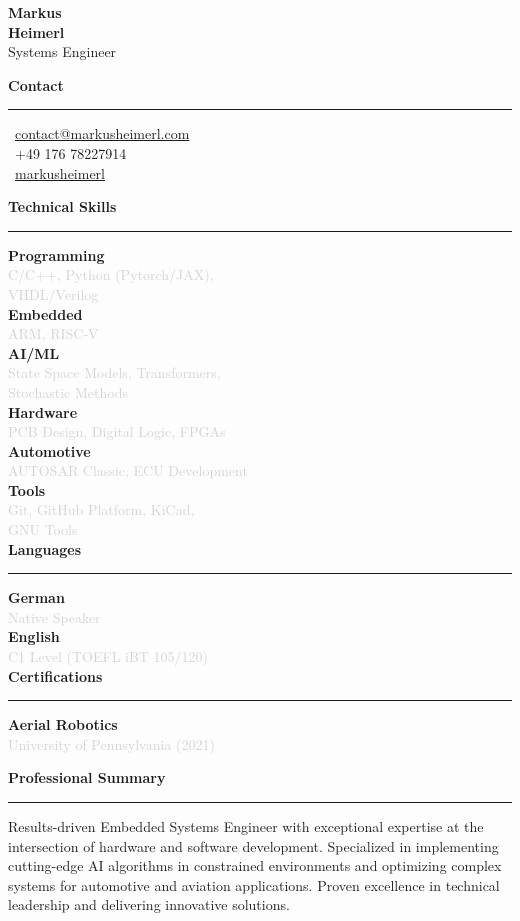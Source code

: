 \documentclass[a4paper,10pt]{article}
\newcommand{\cvsection}[1]{
    \vspace{12pt}
    {\large\bfseries\color{darkgray} #1}
    \vspace{4pt}
    \hrule
    \vspace{8pt}
}
\newcommand{\cvitem}[2]{
    \textbf{\color{darkgray}#1} \\
    \textcolor{lightgray}{\small #2} \\[5pt]
}
\begin{document}
\setlength{\columnsep}{0.8cm}
\begin{paracol}{2}


\vspace{0.5cm}

\begin{center}
    {\LARGE\bfseries\color{darkgray} Markus} \\[4pt]
    {\LARGE\bfseries\color{primaryblue} Heimerl} \\[8pt]
    {\small\color{darkgray} Systems Engineer}
\end{center}

\vspace{0.6cm}

\cvsection{Contact}
\small
\faEnvelope\, \href{mailto:contact@markusheimerl.com}{contact@markusheimerl.com} \\[5pt]
\faPhone\, +49 176 78227914 \\[5pt]
\faGithub\, \href{https://github.com/markusheimerl}{markusheimerl}

\cvsection{Technical Skills}
\cvitem{Programming}{C/C++, Python (Pytorch/JAX),\\ VHDL/Verilog}
\cvitem{Embedded}{ARM, RISC-V}
\cvitem{AI/ML}{State Space Models, Transformers, \\ Stochastic Methods}
\cvitem{Hardware}{PCB Design, Digital Logic, FPGAs}
\cvitem{Automotive}{AUTOSAR Classic, ECU Development}
\cvitem{Tools}{Git, GitHub Platform, KiCad,\\ GNU Tools}

\cvsection{Languages}
\cvitem{German}{Native Speaker}
\cvitem{English}{C1 Level (TOEFL iBT 105/120)}

\cvsection{Certifications}
\textbf{Aerial Robotics} \\
\textcolor{lightgray}{\small University of Pennsylvania (2021)}

\vspace{0.5cm}

\switchcolumn

\vspace{0.5cm}

\cvsection{Professional Summary}
Results-driven Embedded Systems Engineer with exceptional expertise at the intersection of hardware and software development. Specialized in implementing cutting-edge AI algorithms in constrained environments and optimizing complex systems for automotive and aviation applications. Proven excellence in technical leadership and delivering innovative solutions.


\end{paracol}
\end{document}
